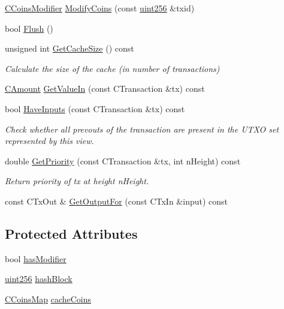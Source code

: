 \begin{DoxyCompactItemize}
\item 
\hyperlink{class_c_coins_modifier}{C\+Coins\+Modifier} \hyperlink{class_c_coins_view_cache_ab67c0d489873ed735c4fc52aa66f0830}{Modify\+Coins} (const \hyperlink{classuint256}{uint256} \&txid)
\item 
bool \hyperlink{class_c_coins_view_cache_ac9888d4feaa46666d03871cd7cd1c01d}{Flush} ()
\item 
unsigned int \hyperlink{class_c_coins_view_cache_a5e8c37ab1b772d00b57e2b40256a4646}{Get\+Cache\+Size} () const 
\begin{DoxyCompactList}\small\item\em Calculate the size of the cache (in number of transactions) \end{DoxyCompactList}\item 
\hyperlink{amount_8h_a4eaf3a5239714d8c45b851527f7cb564}{C\+Amount} \hyperlink{class_c_coins_view_cache_a7fd5ad106e1ac2c2770005672421ff93}{Get\+Value\+In} (const C\+Transaction \&tx) const 
\item 
bool \hyperlink{class_c_coins_view_cache_a2b547a48709e9f9af9a4cfc77a328a3f}{Have\+Inputs} (const C\+Transaction \&tx) const 
\begin{DoxyCompactList}\small\item\em Check whether all prevouts of the transaction are present in the U\+T\+X\+O set represented by this view. \end{DoxyCompactList}\item 
double \hyperlink{class_c_coins_view_cache_a0ba6f2f115a73a91d3cfb8f59569099d}{Get\+Priority} (const C\+Transaction \&tx, int n\+Height) const 
\begin{DoxyCompactList}\small\item\em Return priority of tx at height n\+Height. \end{DoxyCompactList}\item 
const C\+Tx\+Out \& \hyperlink{class_c_coins_view_cache_aa441d7d3869be2f164af1c52a3acb56a}{Get\+Output\+For} (const C\+Tx\+In \&input) const 
\end{DoxyCompactItemize}
\subsection*{Protected Attributes}
\begin{DoxyCompactItemize}
\item 
bool \hyperlink{class_c_coins_view_cache_a363e27234d36bb0fc533d60cd64d1bc3}{has\+Modifier}
\item 
\hyperlink{classuint256}{uint256} \hyperlink{class_c_coins_view_cache_a229dddddbc5501edc250209a2ce5df8b}{hash\+Block}
\item 
\hyperlink{coins_8h_a2886ba2fd0428bae777e1cbcabc02834}{C\+Coins\+Map} \hyperlink{class_c_coins_view_cache_af33cc2c6d38af65ac833d4d13c8e3764}{cache\+Coins}
\end{DoxyCompactItemize}
